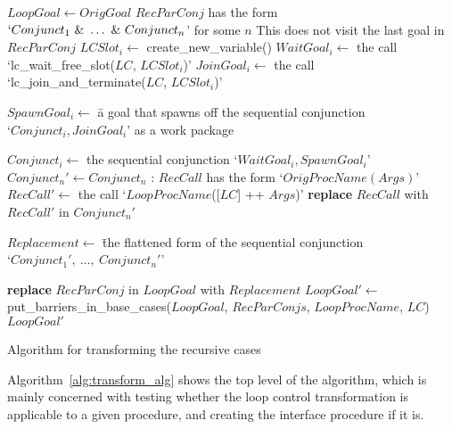 \begin{algorithm}[tbp]
\begin{algorithmic}
  \State $LoopGoal \gets OrigGoal$
    \State $RecParConj$ has the form $`Conjunct_1~\&~\ldots~\&~Conjunct_n$'
        for some $n$
      \Comment This does not visit the last goal in $RecParConj$
      \State $LCSlot_i \gets$ create\_new\_variable()
      \State $WaitGoal_i \gets$ the call
        `lc\_wait\_free\_slot($LC$, $LCSlot_i$)'
      \State $JoinGoal_i \gets$ the call
        `lc\_join\_and\_terminate($LC$, $LCSlot_i$)'
      \State \parbox{0.7\textwidth}{
        \begin{tabbing}
            $SpawnGoal_i \gets$ \=a goal that spawns off the sequential
                conjunction \\
                \>`$Conjunct_i, JoinGoal_i$' as a work package
        \end{tabbing}
        }
      \State $Conjunct_i \gets$ the sequential conjunction
        `$WaitGoal_i, SpawnGoal_i$'
    \EndFor
    \State $Conjunct_n' \gets Conjunct_n$
    :
      \State $RecCall$ has the form `$OrigProcName(Args)$'
      \State $RecCall' \gets$ the call
        `$LoopProcName$([$LC$] ++ $Args$)'
      \State \textbf{replace} $RecCall$ with $RecCall'$ in $Conjunct_n'$
    \EndFor
    \State \parbox{0.7\textwidth}{
        \begin{tabbing}
            $Replacement \gets$ \=the flattened form
                of the sequential conjunction \\
            \>`$Conjunct_1',~\ldots,~Conjunct_n'$'
        \end{tabbing}}
    \State \textbf{replace} $RecParConj$ in $LoopGoal$ with $Replacement$
  \EndFor
  \State $LoopGoal' \gets$ put\_barriers\_in\_base\_cases($LoopGoal$,
    $RecParConjs$, $LoopProcName$, $LC$)
  \State \Return $LoopGoal'$
\EndProcedure
\end{algorithmic}
\caption{Algorithm for transforming the recursive cases}
\label{alg:reccases_alg}
\end{algorithm}

Algorithm~\ref{alg:transform_alg} shows the top level of the algorithm,
which is mainly concerned with testing
whether the loop control transformation is applicable to a given procedure,
and creating the interface procedure if it is.

